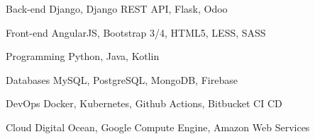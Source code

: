 

\begin{cvskills}

    \cvskill
    {Back-end} %
    {Django, Django REST API, Flask, Odoo} %

    \cvskill
    {Front-end} %
    {AngularJS, Bootstrap 3/4, HTML5, LESS, SASS} %

    \cvskill
    {Programming} %
    {Python, Java, Kotlin} %

    \cvskill
    {Databases} %
    {MySQL, PostgreSQL, MongoDB, Firebase} %

    \cvskill
    {DevOps} %
    {Docker, Kubernetes, Github Actions, Bitbucket CI CD} %

    \cvskill
    {Cloud } %
    {Digital Ocean, Google Compute Engine, Amazon Web Services } %

\end{cvskills}
